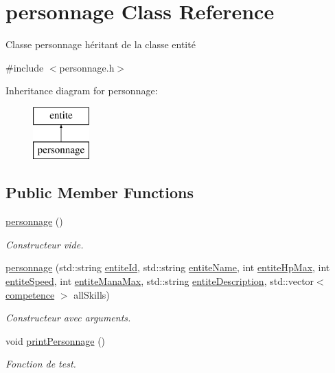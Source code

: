\hypertarget{classpersonnage}{}\section{personnage Class Reference}
\label{classpersonnage}


Classe personnage héritant de la classe entité  




{\ttfamily \#include $<$personnage.\+h$>$}

Inheritance diagram for personnage\+:\begin{figure}[H]
\begin{center}
\leavevmode
\includegraphics[height=2.000000cm]{classpersonnage}
\end{center}
\end{figure}
\subsection*{Public Member Functions}
\begin{DoxyCompactItemize}
\item 
\hyperlink{classpersonnage_acd9ca516f8c5c110687e5167dab8db59}{personnage} ()
\begin{DoxyCompactList}\small\item\em Constructeur vide. \end{DoxyCompactList}\item 
\hyperlink{classpersonnage_adec7b6f38637e7d176e054b68b0fcb23}{personnage} (std\+::string \hyperlink{classentite_a904e8783de9fe2fc4306bf6b7822d025}{entite\+Id}, std\+::string \hyperlink{classentite_abe631a515b1cd0866dcfb078c4ceb07a}{entite\+Name}, int \hyperlink{classentite_a754557f56c1c1fcbcbd40eec68b60f65}{entite\+Hp\+Max}, int \hyperlink{classentite_ad9df70a9bb07f07b3ebf520941c3a35f}{entite\+Speed}, int \hyperlink{classentite_a696167d32c27b3b2a2fa6b473a888b18}{entite\+Mana\+Max}, std\+::string \hyperlink{classentite_a6fab1d9a04ade2cb97ec0904b12c82c9}{entite\+Description}, std\+::vector$<$ \hyperlink{classcompetence}{competence} $>$ all\+Skills)
\begin{DoxyCompactList}\small\item\em Constructeur avec arguments. \end{DoxyCompactList}\item 
void \hyperlink{classpersonnage_a173f1b07d9098a96fd189ede2e7dad59}{print\+Personnage} ()
\begin{DoxyCompactList}\small\item\em Fonction de test. \end{DoxyCompactList}\end{DoxyCompactItemize}
